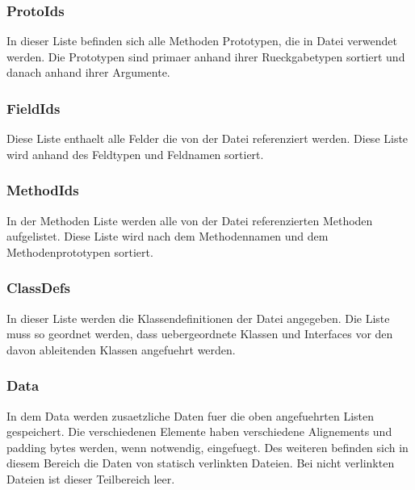 \documentclass[11pt,conference,a4paper]{IEEEtran}
\begin{document}
\subsubsection{ProtoIds}
In dieser Liste befinden sich alle Methoden Prototypen, die in  Datei verwendet werden. Die Prototypen sind primaer anhand ihrer Rueckgabetypen sortiert und danach anhand ihrer Argumente.

\subsubsection{FieldIds}
Diese Liste enthaelt alle Felder die von der  Datei referenziert werden. Diese Liste wird anhand des Feldtypen und Feldnamen sortiert.

\subsubsection{MethodIds}
In der Methoden Liste werden alle von der  Datei referenzierten Methoden aufgelistet. Diese Liste wird nach dem Methodennamen und dem Methodenprototypen sortiert.

\subsubsection{ClassDefs}
In dieser Liste werden die Klassendefinitionen der  Datei angegeben. Die Liste muss so geordnet werden, dass uebergeordnete Klassen und Interfaces vor den davon ableitenden Klassen angefuehrt werden.

\subsubsection{Data}
In dem Data werden zusaetzliche Daten fuer die oben angefuehrten Listen gespeichert. Die verschiedenen Elemente haben verschiedene Alignements und padding bytes werden, wenn notwendig, eingefuegt. Des weiteren befinden sich in diesem Bereich die Daten von statisch verlinkten Dateien. Bei nicht verlinkten Dateien ist dieser Teilbereich leer.
\end{document}

